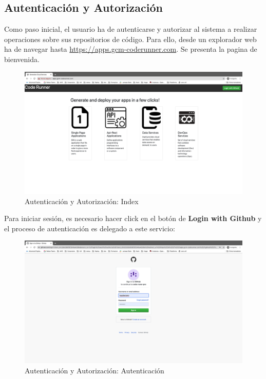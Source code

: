 \documentclass[a4paper,11pt]{book}
\begin{document}
\subsection{Autenticación y Autorización}

Como paso inicial, el usuario ha de autenticarse y autorizar al sistema a realizar operaciones sobre sus repositorios de código. Para ello, desde un explorador web ha de navegar hasta \url{https://apps.gcm-coderunner.com}. Se presenta la pagina de bienvenida. 

\begin{figure}[H]
\centering
\includegraphics[scale=0.2]{imagenes/casouso/1.png}
\caption{  Autenticación y Autorización: Index }
\end{figure}

Para iniciar sesión, es necesario hacer click en el botón de \textbf{Login with Github} y el proceso de autenticación es delegado a este servicio:

\begin{figure}[H]
\centering
\includegraphics[scale=0.2]{imagenes/casouso/2.png}
\caption{  Autenticación y Autorización: Autenticación }
\end{figure}
\end{document}
